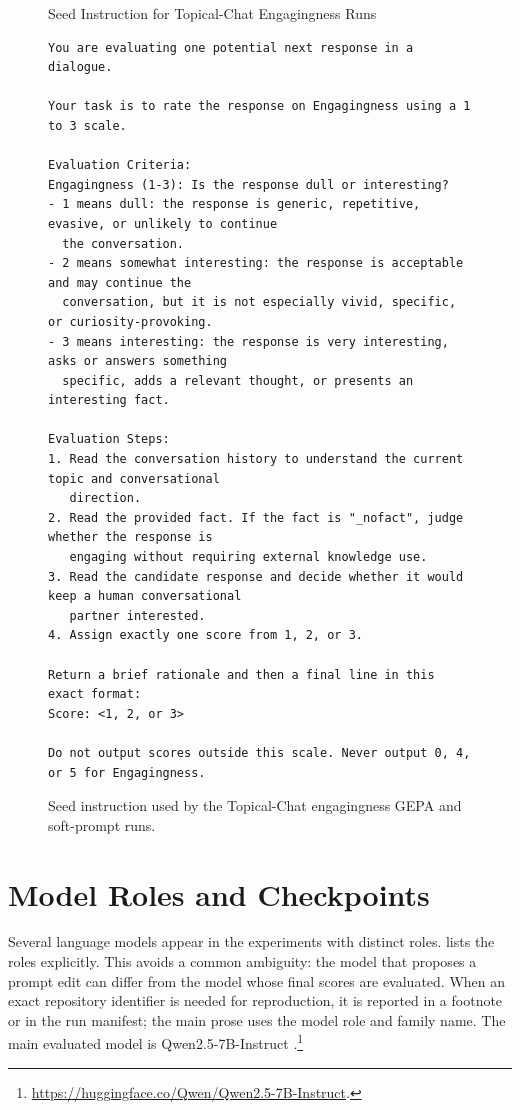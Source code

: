 \documentclass[12pt,a4paper,twoside,openright]{book}
\begin{document}
\begin{figure}[!htb]
    \centering
    \begin{thesispromptbox}[width=0.98\linewidth]{Seed Instruction for Topical-Chat Engagingness Runs}
\begin{Verbatim}[fontsize=\scriptsize]
You are evaluating one potential next response in a dialogue.

Your task is to rate the response on Engagingness using a 1 to 3 scale.

Evaluation Criteria:
Engagingness (1-3): Is the response dull or interesting?
- 1 means dull: the response is generic, repetitive, evasive, or unlikely to continue
  the conversation.
- 2 means somewhat interesting: the response is acceptable and may continue the
  conversation, but it is not especially vivid, specific, or curiosity-provoking.
- 3 means interesting: the response is very interesting, asks or answers something
  specific, adds a relevant thought, or presents an interesting fact.

Evaluation Steps:
1. Read the conversation history to understand the current topic and conversational
   direction.
2. Read the provided fact. If the fact is "_nofact", judge whether the response is
   engaging without requiring external knowledge use.
3. Read the candidate response and decide whether it would keep a human conversational
   partner interested.
4. Assign exactly one score from 1, 2, or 3.

Return a brief rationale and then a final line in this exact format:
Score: <1, 2, or 3>

Do not output scores outside this scale. Never output 0, 4, or 5 for Engagingness.
\end{Verbatim}
    \end{thesispromptbox}
    \caption{Seed instruction used by the Topical-Chat engagingness GEPA and
    soft-prompt runs.}
    \label{fig:setup-seed-engagingness-prompt}
\end{figure}

\section{Model Roles and Checkpoints}
\label{sec:setup-models}

Several language models appear in the experiments with distinct roles.
 lists the roles explicitly. This avoids a common
ambiguity: the model that proposes a prompt edit can differ from the model whose
final scores are evaluated. When an exact repository identifier is needed for
reproduction, it is reported in a footnote or in the run manifest; the main
prose uses the model role and family name. The main evaluated model is
Qwen2.5-7B-Instruct
\cite{DBLP:journals/corr/abs-2412-15115}.\footnote{\url{https://huggingface.co/Qwen/Qwen2.5-7B-Instruct}.}
\end{document}
